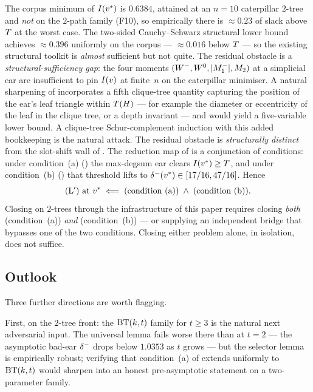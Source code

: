 The corpus minimum of $I(v^{*})$ is $0.6384$, attained at an $n = 10$
caterpillar $2$-tree and \emph{not} on the $2$-path family (F10), so
empirically there is $\approx 0.23$ of slack above $T$ at the
worst case. The two-sided Cauchy--Schwarz structural lower bound
 achieves $\approx 0.396$ uniformly on the
corpus — $\approx 0.016$ below $T$ — so the existing
structural toolkit is \emph{almost} sufficient but not quite. The
residual obstacle is a \emph{structural-sufficiency gap}: the four
moments $(W^{-}, W^{0}, |M_{1}^{-}|, M_{2})$ at a simplicial ear are
insufficient to pin $I(v)$ at finite~$n$ on the caterpillar minimiser. A
natural sharpening of  incorporates a fifth
clique-tree quantity capturing the position of the ear's leaf triangle
within $T(H)$ — for example the diameter or eccentricity
of the leaf in the clique tree, or a depth invariant — and would yield
a five-variable lower bound. A clique-tree Schur-complement induction
with this added bookkeeping is the natural attack. The residual
obstacle is \emph{structurally distinct} from the slot-shift wall of
. The reduction map of
 is a conjunction of conditions: under
condition~(a) () the max-degsum ear clears
$I(v^{*}) \ge T$, and under condition~(b) () that
threshold lifts to $\delta^{-}(v^{*}) \in [17/16, 47/16]$. Hence
\[
(\mathrm{L}') \text{ at } v^{*} \;\Longleftarrow\;
\text{(condition (a))} \;\wedge\; \text{(condition (b))}.
\]
Closing  on $2$-trees through the infrastructure of
this paper requires closing \emph{both} 
(condition~(a)) \emph{and}  (condition~(b))
— or supplying an independent bridge that bypasses one of the two
conditions. Closing either problem alone, in isolation, does not
suffice.

\subsection{Outlook}\label{sec:open:outlook}

Three further directions are worth flagging.

First, on the $2$-tree front: the $\mathrm{BT}(k,t)$ family for $t \ge 3$ is
the natural next adversarial input. The universal lemma fails worse
there than at $t = 2$ — the asymptotic bad-ear $\delta^{-}$ drops below
$1.0353$ as $t$ grows — but the selector lemma is empirically robust;
verifying that condition~(a) of  extends
uniformly to $\mathrm{BT}(k,t)$ would sharpen  into
an honest pre-asymptotic statement on a two-parameter family.

